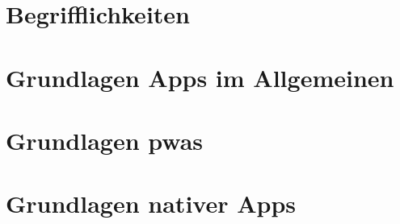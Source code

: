 \section{Begrifflichkeiten} \label{sec:2-begriffe}


\section{Grundlagen Apps im Allgemeinen} \label{sec:2-apps}


\section{Grundlagen \acfp{pwa}} \label{sec:2-pwa}


\section{Grundlagen nativer Apps} \label{sec:2-nativ}
